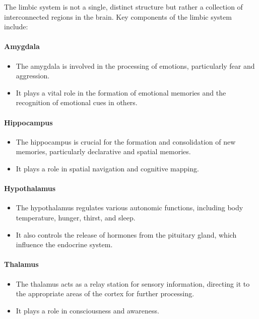 \documentclass{article}
\begin{document}
The limbic system is not a single, distinct structure but rather a collection of interconnected regions in the brain. Key components of the limbic system include:

\paragraph{Amygdala}

\begin{itemize}
  \item The amygdala is involved in the processing of emotions, particularly fear and aggression.
  \item It plays a vital role in the formation of emotional memories and the recognition of emotional cues in others.
\end{itemize}

\paragraph{Hippocampus}

\begin{itemize}
  \item The hippocampus is crucial for the formation and consolidation of new memories, particularly declarative and spatial memories.
  \item It plays a role in spatial navigation and cognitive mapping.
\end{itemize}

\paragraph{Hypothalamus}

\begin{itemize}
  \item The hypothalamus regulates various autonomic functions, including body temperature, hunger, thirst, and sleep.
  \item It also controls the release of hormones from the pituitary gland, which influence the endocrine system.
\end{itemize}

\paragraph{Thalamus}

\begin{itemize}
  \item The thalamus acts as a relay station for sensory information, directing it to the appropriate areas of the cortex for further processing.
  \item It plays a role in consciousness and awareness.
\end{itemize}
\end{document}
